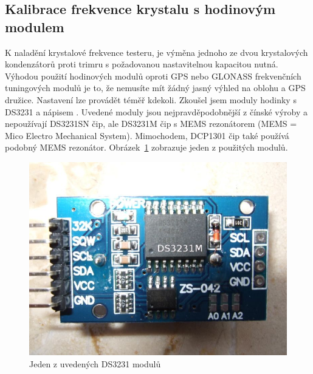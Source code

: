 \subsection{Kalibrace frekvence krystalu s hodinovým modulem}

K naladění krystalové frekvence testeru, je výměna jednoho ze dvou krystalových kondenzátorů
proti trimru s požadovanou nastavitelnou kapacitou nutná.
Výhodou použití hodinových modulů oproti GPS nebo GLONASS frekvenčních tuningových modulů je to,
že nemusíte mít žádný jasný výhled na oblohu a GPS družice.
Nastavení lze provádět téměř kdekoli.
Zkoušel jsem moduly hodinky s DS3231 a nápisem .
Uvedené moduly jsou nejpravděpodobnější z čínské výroby a nepoužívají DS3231SN čip,
ale DS3231M čip s MEMS rezonátorem (MEMS = Mico Electro Mechanical System).
Mimochodem, DCP1301 čip také používá podobný MEMS rezonátor.
Obrázek~\ref{fig:DS3231M} zobrazuje jeden z použitých modulů.

\begin{figure}[H]
\centering
\includegraphics[width=.6\textwidth]{../PNG/DS3231M.jpg}
\caption{Jeden z uvedených DS3231 modulů}
\label{fig:DS3231M}
\end{figure}

